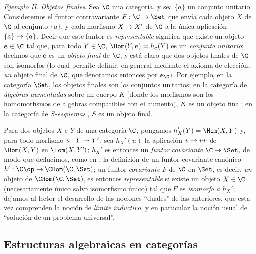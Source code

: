\documentclass[oneside]{amsart}
\makeatletter
\newcommand{\ega@arrow}[2]{\mathchoice{#1}{#2}{#2}{#2}}
\let\ega@shortmapsto\mapsto
\renewcommand{\to}{\ega@arrow{\longrightarrow}{\rightarrow}}
\renewcommand{\mapsto}{\ega@arrow{\longmapsto}{\ega@shortmapsto}}
\let\EGAOriginalLabel\label
\renewcommand{\label}[1]{\phantomsection\EGAOriginalLabel{#1}}
\makeatother
\begin{document}
\begin{env}[8.1.10]
\label{0.8.1.10}
\textit{Ejemplo II. Objetos finales}.
Sea $\C$ una categoría, y sea $\{a\}$ un conjunto unitario.
Consideremos el funtor contravariante $F:\C\to\Set$ que envía cada objeto $X$ de $\C$ al conjunto $\{a\}$, y cada morfismo $X\to X'$ de $\C$ a la única aplicación $\{a\}\to\{a\}$.
Decir que este funtor es \emph{representable} significa que existe un objeto $\boldsymbol{e}\in\C$ tal que, para todo $Y\in\C$, $\Hom(Y,\boldsymbol{e})=h_{\mathbf{e}}(Y)$ es un \emph{conjunto unitario}; decimos que $\boldsymbol{e}$ es un \emph{objeto final} de $\C$, y está claro que dos objetos finales de $\C$ son isomorfos (lo cual permite definir, en general mediante el axioma de elección, \emph{un} objeto final de $\C$, que denotamos entonces por $\boldsymbol{e}_\C$).
Por ejemplo, en la categoría $\Set$, los objetos finales son los conjuntos unitarios; en la categoría de \emph{álgebras aumentadas} sobre un cuerpo $K$ (donde los morfismos son los homomorfismos de álgebras compatibles con el aumento), $K$ es un objeto final; en la categoría de \emph{$S$-esquemas} , $S$ es un objeto final.
\end{env}

\begin{env}[8.1.11]
\label{0.8.1.11}
Para dos objetos $X$ e $Y$ de una categoría $\C$, pongamos $h_X'(Y)=\Hom(X,Y)$ y, para todo morfismo $u:Y\to Y'$, sea $h_X'(u)$ la aplicación $v\mapsto uv$ de $\Hom(X,Y)$ en $\Hom(X,Y')$; $h_X'$ es entonces un \emph{funtor covariante $\C\to\Set$}, de modo que deducimos, como en , la definición de un funtor covariante canónico $h':\C\op\to\CHom(\C,\Set)$; un funtor \emph{covariante} $F$ de $\C$ en $\Set$, es decir, \emph{un} objeto de $\CHom(\C,\Set)$, es entonces \emph{representable} si existe un objeto $X\in\C$ (necesariamente único salvo isomorfismo único) tal que $F$ es \emph{isomorfo a $h_X'$}; dejamos al lector el desarrollo de las nociones ``duales'' de las anteriores, que esta vez comprenden la noción de \emph{límite inductivo}, y en particular la noción usual de ``solución de un problema universal''.
\end{env}

\subsection{Estructuras algebraicas en categorías}
\label{subsection:0.8.2}
\end{document}
